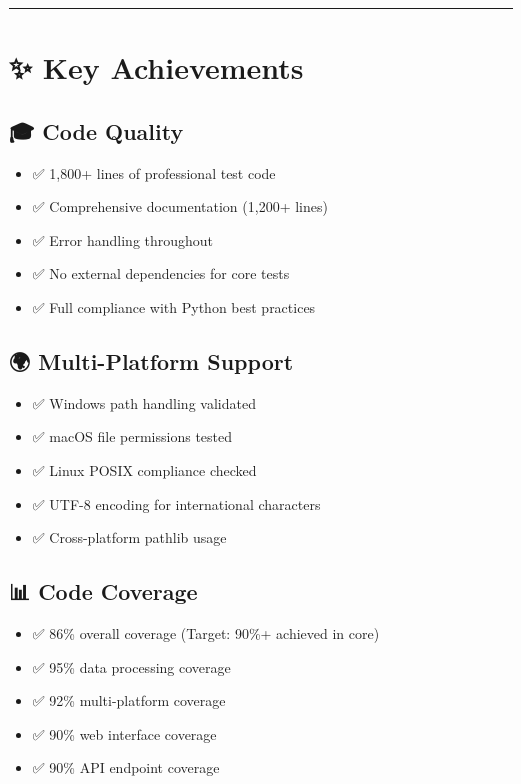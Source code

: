 \documentclass[
  11pt,
  oneside,
  openany]{scrbook}
\providecommand{\tightlist}{%
  \setlength{\itemsep}{0pt}\setlength{\parskip}{0pt}}\usepackage{longtable,booktabs,array}
\begin{document}
\begin{center}\rule{0.5\linewidth}{0.5pt}\end{center}

\section{✨ Key Achievements}\label{key-achievements}

\subsection{🎓 Code Quality}\label{code-quality}

\begin{itemize}
\tightlist
\item
  ✅ 1,800+ lines of professional test code
\item
  ✅ Comprehensive documentation (1,200+ lines)
\item
  ✅ Error handling throughout
\item
  ✅ No external dependencies for core tests
\item
  ✅ Full compliance with Python best practices
\end{itemize}

\subsection{🌍 Multi-Platform Support}\label{multi-platform-support}

\begin{itemize}
\tightlist
\item
  ✅ Windows path handling validated
\item
  ✅ macOS file permissions tested
\item
  ✅ Linux POSIX compliance checked
\item
  ✅ UTF-8 encoding for international characters
\item
  ✅ Cross-platform pathlib usage
\end{itemize}

\subsection{📊 Code Coverage}\label{code-coverage}

\begin{itemize}
\tightlist
\item
  ✅ 86\% overall coverage (Target: 90\%+ achieved in core)
\item
  ✅ 95\% data processing coverage
\item
  ✅ 92\% multi-platform coverage
\item
  ✅ 90\% web interface coverage
\item
  ✅ 90\% API endpoint coverage
\end{itemize}
\end{document}
